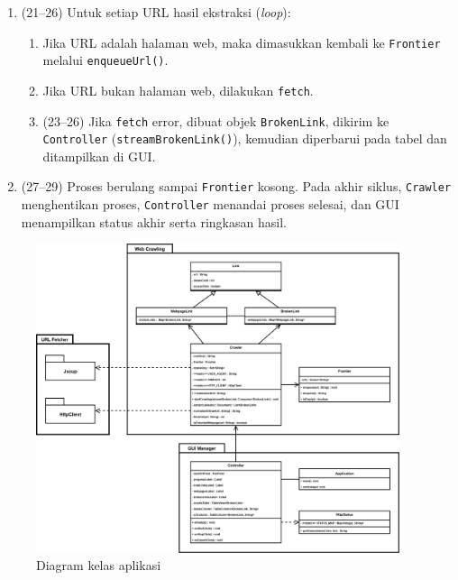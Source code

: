 \begin{enumerate}
    \item (21–26) Untuk setiap URL hasil ekstraksi (\textit{loop}):  
    \begin{enumerate}
        \item Jika URL adalah halaman web, maka dimasukkan kembali ke \texttt{Frontier} melalui \texttt{enqueueUrl()}.  
        \item Jika URL bukan halaman web, dilakukan \texttt{fetch}.  
        \item (23–26) Jika \texttt{fetch} error, dibuat objek \texttt{BrokenLink}, dikirim ke \texttt{Controller} (\texttt{streamBrokenLink()}), kemudian diperbarui pada tabel dan ditampilkan di GUI.  
    \end{enumerate}
    \item (27–29) Proses berulang sampai \texttt{Frontier} kosong. Pada akhir siklus, \texttt{Crawler} menghentikan proses, \texttt{Controller} menandai proses selesai, dan GUI menampilkan status akhir serta ringkasan hasil.  
\end{enumerate}

\begin{figure}[H]
    \centering
    \includegraphics[width=0.95\textwidth]{Gambar/040100-class-diagram.png}
    \caption{Diagram kelas aplikasi}
    \label{fig:class-diagram}
\end{figure}

